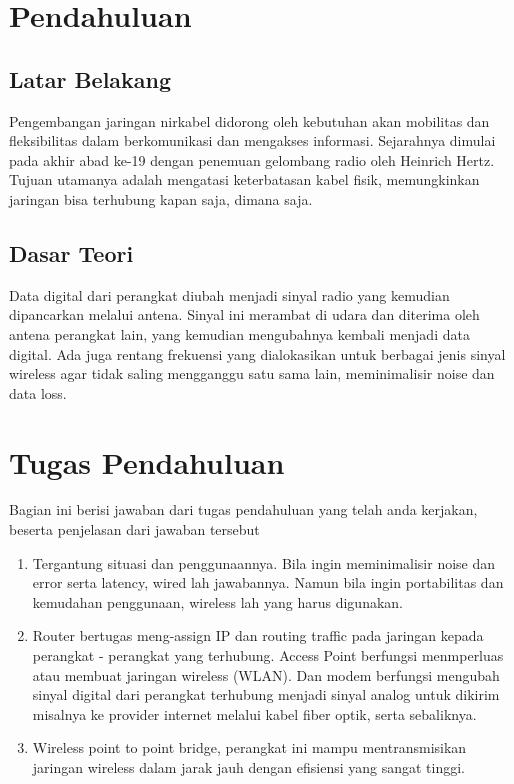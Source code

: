 \section{Pendahuluan}
\subsection{Latar Belakang}
 Pengembangan jaringan nirkabel didorong oleh kebutuhan akan mobilitas dan fleksibilitas dalam berkomunikasi dan mengakses informasi. Sejarahnya dimulai pada akhir abad ke-19 dengan penemuan gelombang radio oleh Heinrich Hertz. Tujuan utamanya adalah mengatasi keterbatasan kabel fisik, memungkinkan jaringan bisa terhubung kapan saja, dimana saja.

\subsection{Dasar Teori}
 Data digital dari perangkat diubah menjadi sinyal radio yang kemudian dipancarkan melalui antena. Sinyal ini merambat di udara dan diterima oleh antena perangkat lain, yang kemudian mengubahnya kembali menjadi data digital. Ada juga rentang frekuensi yang dialokasikan untuk berbagai jenis sinyal wireless agar tidak saling mengganggu satu sama lain, meminimalisir noise dan data loss.

\section{Tugas Pendahuluan}
Bagian ini berisi jawaban dari tugas pendahuluan yang telah anda kerjakan, beserta penjelasan dari jawaban tersebut
\begin{enumerate}
	\item Tergantung situasi dan penggunaannya. Bila ingin meminimalisir noise dan error serta latency, wired lah jawabannya. Namun bila ingin portabilitas dan kemudahan penggunaan, wireless lah yang harus digunakan.
	\item Router bertugas meng-assign IP dan routing traffic pada jaringan kepada perangkat - perangkat yang terhubung. Access Point berfungsi menmperluas atau membuat jaringan wireless (WLAN). Dan modem berfungsi mengubah sinyal digital dari perangkat terhubung menjadi sinyal analog untuk dikirim misalnya ke provider internet melalui kabel fiber optik, serta sebaliknya.
	\item Wireless point to point bridge, perangkat ini mampu mentransmisikan jaringan wireless dalam jarak jauh dengan efisiensi yang sangat tinggi.
\end{enumerate}
